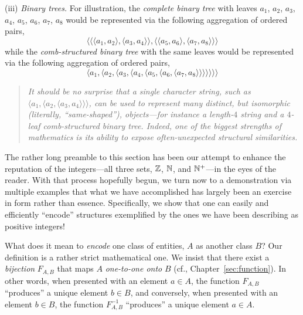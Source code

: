 \noindent
(iii) {\em Binary trees.}
%
For illustration, the {\em complete binary tree}
with leaves $a_1$, $a_2$, $a_3$, $a_4$, $a_5$, $a_6$, $a_7$, $a_8$
would be represented via the following aggregation of ordered pairs,
\[
\langle
\langle \langle a_1,  a_2 \rangle, \langle a_3,  a_4 \rangle \rangle,
\langle \langle a_5,  a_6 \rangle, \langle a_7,  a_8 \rangle \rangle
\rangle
\]
while the {\em comb-structured binary tree}
with the same leaves would be represented via the following
aggregation of ordered pairs,
\[
\langle a_1, \langle a_2, \langle a_3, \langle a_4, \langle a_5,
\langle a_6, \langle a_7, a_8 \rangle \rangle \rangle \rangle
\rangle \rangle \rangle
\]
\begin{quote}
{\em It should be no surprise that a single character string, such as
  $\langle a_1, \langle a_2, \langle a_3, a_4 \rangle \rangle
  \rangle$, can be used to represent many distinct, but {\em
    isomorphic} (literally, ``same-shaped''), objects---for instance a
  length-$4$ string and a $4$-leaf comb-structured binary tree.
  Indeed, one of the biggest strengths of mathematics is its ability
  to expose often-unexpected structural similarities.  }
\end{quote}

\medskip

The rather long preamble to this section has been our attempt to
enhance the reputation of the integers---all three sets, $\mathbb{Z}$, $\mathbb{N}$,
and $\mathbb{N}^+$---in the eyes of the reader.  With that process hopefully
begun, we turn now to a demonstration via multiple examples that what
we have accomplished has largely been an exercise in form rather than
essence.  Specifically, we show that one can easily and efficiently
``encode'' structures exemplified by the ones we have been describing
as positive integers!

\medskip

\noindent
What does it mean to {\em encode}  one class of
  entities, $A$ as another class $B$?  Our definition is a rather
  strict mathematical one.  We insist that there exist a {\em
    bijection} $F_{A,B}$ that maps $A$ {\em one-to-one onto} $B$ (cf.,
  Chapter~\ref{sec:function}).  In other words, when presented with an
  element $a \in A$, the function $F_{A,B}$ ``produces'' a unique
  element $b \in B$, and conversely, when presented with an element $b
  \in B$, the function $F^{-1}_{A,B}$ ``produces'' a unique element $a
  \in A$.

